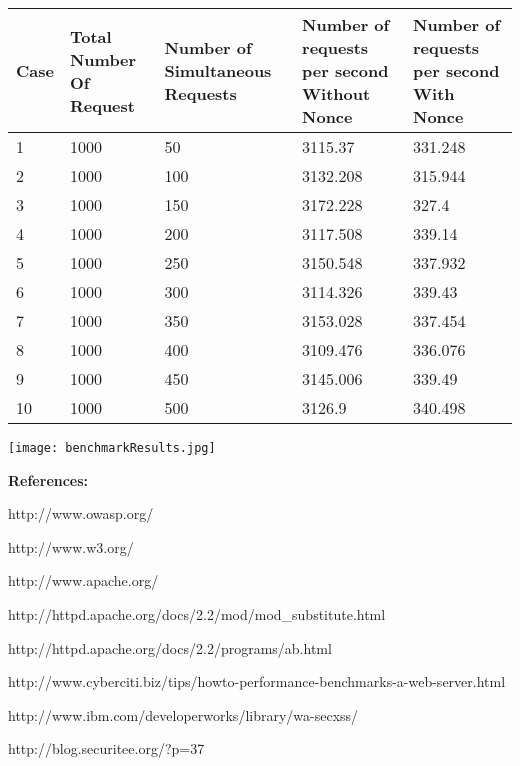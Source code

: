 \documentclass{article}
\begin{document}
\begin{table}[ht]            %
\begin{tabular}{|p{1cm} |p{3cm} |p{3cm} |p{3cm} |p{3cm} |} %
\hline                               %
Case & Total Number Of Request & Number of Simultaneous Requests & Number of requests per second Without Nonce & Number of requests per second With Nonce \\ [0.5ex] %
\hline %
1 & 1000 & 50 & 3115.37 & 331.248 \\
2 & 1000 & 100 & 3132.208 & 315.944 \\
3 & 1000 & 150 & 3172.228 & 327.4 \\
4 & 1000 & 200 & 3117.508 & 339.14 \\
5 & 1000 & 250 & 3150.548 & 337.932 \\
6 & 1000 & 300 & 3114.326 & 339.43 \\
7 & 1000 & 350 & 3153.028 & 337.454 \\
8 & 1000 & 400 & 3109.476 & 336.076 \\
9 & 1000 & 450 & 3145.006 & 339.49 \\
10 & 1000 & 500 & 3126.9 & 340.498 \\

\hline %
\end{tabular}
\label{table:nonlin} %
\end{table}
\bigskip

\begin{center}
\texttt{[image: benchmarkResults.jpg]}
\end{center}



\noindent
\textbf{References:}
\medskip

http://www.owasp.org/

http://www.w3.org/

http://www.apache.org/

http://httpd.apache.org/docs/2.2/mod/mod\_substitute.html

http://httpd.apache.org/docs/2.2/programs/ab.html

http://www.cyberciti.biz/tips/howto-performance-benchmarks-a-web-server.html

http://www.ibm.com/developerworks/library/wa-secxss/

http://blog.securitee.org/?p=37
\end{document}
